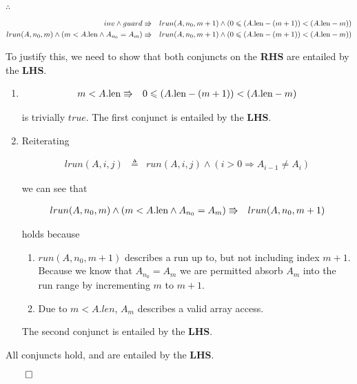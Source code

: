 \documentclass[a4paper]{article}
\newcommand{\LEN}{\mbox{len}}
\newcommand{\INV}{lrun(A, n_0, m)}
\newcommand{\GUARD}{(m < A.\LEN \land A_{n_{0}} = A_m)}
\newcommand{\LRUN}[3]{run({#1}, {#2}, {#3}) \land ({#2} > 0 \Rightarrow A_{{#2} - 1} \neq A_{{#2}})}
\newcommand{\INNERLOOPPOSTEXPANSION}{lrun(A, n_0, m + 1) \land (0 \leqslant (A.\LEN - (m + 1)) < (A.\LEN - m))}
\begin{document}
\begin{enumerate}
\begin{enumerate}
$\therefore$

\begin{eqnarray*}
inv \land guard & \entails & \INNERLOOPPOSTEXPANSION\\
\INV \land \GUARD & \entails & \INNERLOOPPOSTEXPANSION
\end{eqnarray*}

To justify this, we need to show that both conjuncts on the \textbf{RHS} are entailed by the \textbf{LHS}.


\begin{enumerate}
	\item

	\begin{eqnarray*}
	m < A.\LEN & \entails & 0 \leqslant (A.\LEN - (m + 1)) < (A.\LEN - m)
	\end{eqnarray*}

	is trivially $true$. The first conjunct is entailed by the \textbf{LHS}.\\

	\item

	Reiterating

	\begin{eqnarray*}
	lrun(A, i, j) & \triangleq & \LRUN{A}{i}{j}
	\end{eqnarray*}

	we can see that

	\begin{eqnarray*}
	\INV \land \GUARD & \entails & lrun(A, n_0, m + 1)
	\end{eqnarray*}

	holds because

	\begin{enumerate}
		\item $run(A, n_0, m + 1)$ describes a run up to, but not including index $m + 1$. Because we know that $A_{n_{0}} = A_m$ we are permitted absorb $A_m$ into the run range by incrementing $m$ to $m + 1$.
		\item Due to $m < A.len$, $A_m$ describes a valid array access.
	\end{enumerate}

	The second conjunct is entailed by the \textbf{LHS}.

\end{enumerate}

All conjuncts hold, and are entailed by the \textbf{LHS}.

$\qed$

	\end{enumerate}


\end{enumerate}
\end{document}
